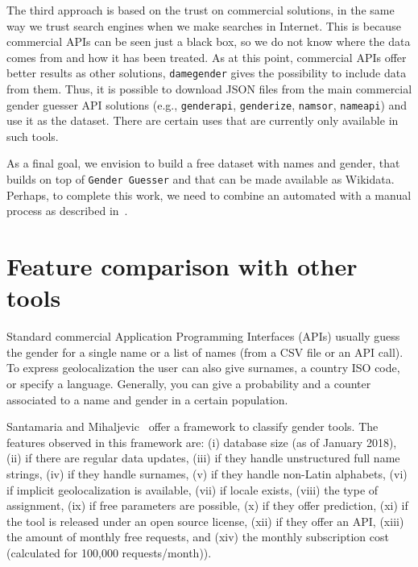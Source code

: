 \documentclass[a4paper]{article}
\begin{document}
The third approach is based on the trust on commercial solutions, in the same way we trust search engines when we make searches in Internet.
This is because commercial APIs can be seen just a black box, so we do not know where the data comes from and how it has been treated.
As at this point, commercial APIs offer better results as other solutions, \texttt{damegender} gives the possibility to include data from them.
Thus, it is possible to download JSON files from the main commercial gender guesser API solutions (e.g., \texttt{genderapi}, \texttt{genderize}, \texttt{namsor}, \texttt{nameapi}) and use it as the dataset.
There are certain uses that are currently only available in such tools.


As a final goal, we envision to build a free dataset with names and gender, that builds on top of \texttt{Gender Guesser} and that can be made available as Wikidata. 
Perhaps, to complete this work, we need to combine an automated with a manual process as described in~\cite{10.7717/peerj-cs.156}.



\section{Feature comparison with other tools}

Standard commercial Application Programming Interfaces (APIs) usually guess the gender for a single name or a list of names (from a CSV file or an API call). 
To express geolocalization the user can also give surnames, a country ISO code, or specify a language.
Generally, you can give a probability and a counter associated to a name and gender in a certain population.

Santamaria and Mihaljevic~\cite{10.7717/peerj-cs.156} offer a framework to classify gender tools.
The features observed in this framework are: (i) database size (as of January 2018), (ii) if there are regular data updates, (iii) if they handle unstructured full name strings, (iv) if they handle surnames, (v) if they handle non-Latin alphabets, (vi) if implicit geolocalization is available, (vii) if locale exists, (viii) the type of assignment, (ix) if free parameters are possible, (x) if they offer prediction, (xi) if the tool is released under an open source license, (xii) if they offer an API, (xiii) the amount of monthly free requests, and (xiv) the monthly subscription cost (calculated for 100,000 requests/month)).
\end{document}
